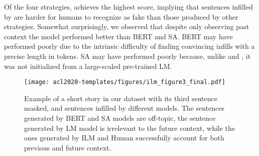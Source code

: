 Of the four strategies, \ilm{} achieves the highest score, implying that sentences infilled by \ilm{} are harder for humans to recognize as fake than those produced by other strategies. 
Somewhat surprisingly, we observed that despite only observing past context the \lm{} model performed better than BERT and SA. 
BERT may have performed poorly due to the intrinsic difficulty of finding convincing infills with a precise length in tokens. 
SA may have performed poorly because, unlike \lm{} and \ilm{}, it was not initialized from a large-scaled pre-trained LM. 

\begin{figure}[t]
    \centering
    \texttt{[image: acl2020-templates/figures/ilm\_figure3\_final.pdf]}
    \vspace{-1cm}
    \caption{Example of a short story in our \stories{} dataset with its third sentence masked, and sentences infilled by different models. The sentences generated by BERT and SA models are off-topic, the sentence generated by LM model is irrelevant to the future context, while the ones generated by ILM and Human successfully account for both previous and future context.}
    \label{fig:human_eval_example}
\end{figure}
